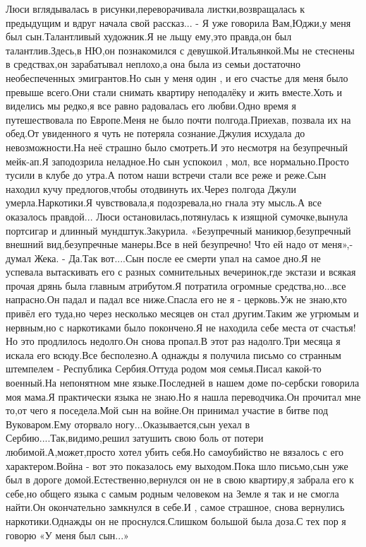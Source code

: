 Люси вглядывалась в рисунки,переворачивала листки,возвращалась к предыдущим и вдруг начала свой рассказ...
- Я уже говорила Вам,Юджи,у меня был сын.Талантливый художник.Я не льщу ему,это правда,он был талантлив.Здесь,в НЮ,он познакомился с девушкой.Итальянкой.Мы не стеснены в средствах,он зарабатывал неплохо,а она была из семьи достаточно необеспеченных эмигрантов.Но сын у меня один ,  и его счастье для меня было превыше всего.Они стали снимать квартиру неподалёку и жить вместе.Хоть и виделись мы редко,я все равно радовалась его любви.Одно время я путешествовала по Европе.Меня не было почти полгода.Приехав, позвала их на обед.От увиденного я чуть не потеряла сознание.Джулия исхудала до невозможности.На неё страшно было смотреть.И это несмотря на безупречный мейк-ап.Я заподозрила неладное.Но сын успокоил , мол, все нормально.Просто тусили в клубе до утра.А потом наши встречи стали все реже и реже.Сын находил кучу предлогов,чтобы отодвинуть их.Через полгода Джули умерла.Наркотики.Я чувствовала,я подозревала,но гнала эту мысль.А все оказалось правдой...
Люси остановилась,потянулась к изящной сумочке,вынула портсигар и длинный мундштук.Закурила. «Безупречный маникюр,безупречный внешний вид,безупречные манеры.Все в ней безупречно! Что ей надо от меня»,- думал Жека.
- Да.Так вот....Сын после ее смерти упал на самое дно.Я не успевала вытаскивать его с разных сомнительных вечеринок,где экстази и всякая прочая дрянь была главным атрибутом.Я потратила огромные средства,но...все напрасно.Он падал и падал все ниже.Спасла его не я - церковь.Уж не знаю,кто привёл его туда,но через несколько месяцев он стал другим.Таким же угрюмым и нервным,но с наркотиками было покончено.Я не находила себе места от счастья! Но это продлилось недолго.Он снова пропал.В этот раз надолго.Три месяца я искала его всюду.Все бесполезно.А однажды я получила письмо со странным штемпелем - Республика Сербия.Оттуда родом моя семья.Писал какой-то военный.На непонятном мне языке.Последней в нашем доме по-сербски говорила моя мама.Я практически языка не знаю.Но я нашла переводчика.Он прочитал мне то,от чего я поседела.Мой сын на войне.Он принимал участие в битве под Вуковаром.Ему оторвало ногу...Оказывается,сын уехал в Сербию....Так,видимо,решил затушить свою боль от потери любимой.А,может,просто хотел убить себя.Но самоубийство не вязалось с его характером.Война - вот это показалось ему выходом.Пока шло письмо,сын уже был в дороге домой.Естественно,вернулся он не в свою квартиру,я забрала его к себе,но общего языка с самым родным человеком на Земле я так и не смогла найти.Он окончательно замкнулся в себе.И , самое страшное, снова вернулись наркотики.Однажды он не проснулся.Слишком большой была доза.С тех пор я говорю «У меня был сын...» 
